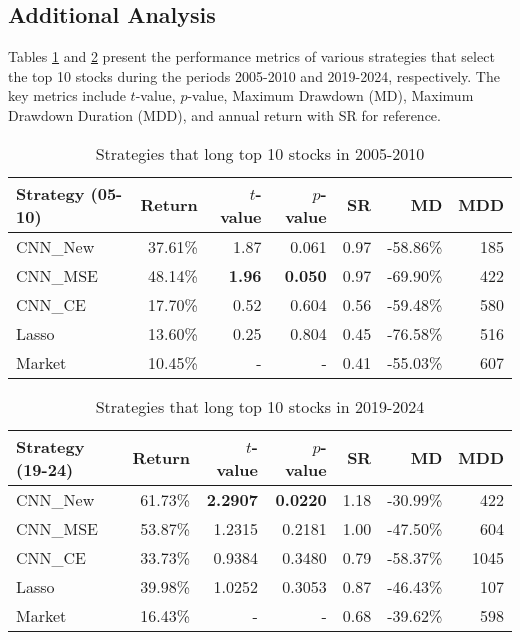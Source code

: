 \documentclass[preprint,12pt,numafflabel,authoryear]{elsarticle}
\begin{document}
\subsection{Additional Analysis}
\label{sec:Additional Analysis}

Tables \ref{tab:compare_05-10} and \ref{tab:compare_19-24} present the performance metrics of various strategies that select the top 10 stocks during the periods 2005-2010 and 2019-2024, respectively. The key metrics include $t$-value, $p$-value, Maximum Drawdown (MD), Maximum Drawdown Duration (MDD), and annual return with SR for reference.

\begin{table}[htp]
\centering
\begin{tabular}{lrrrrrr}
\toprule
Strategy (05-10) &  Return &  $t$-value & $p$-value &  SR &  MD &  MDD \\
\midrule
CNN\_New &             37.61\% &   1.87 &   0.061 &        0.97 &       -58.86\% &                    185 \\
CNN\_MSE &             48.14\% &   \textbf{1.96} &   \textbf{0.050} &        0.97 &       -69.90\% &                    422 \\
CNN\_CE &             17.70\% &   0.52 &   0.604 &        0.56 &       -59.48\% &                    580 \\
Lasso &             13.60\% &   0.25 &   0.804 &        0.45 &       -76.58\% &                    516 \\
Market &             10.45\% &      - &      - &        0.41 &       -55.03\% &                    607 \\
\bottomrule
\end{tabular}
\caption{Strategies that long top 10 stocks in 2005-2010}
\label{tab:compare_05-10}
\end{table}

\begin{table}[htp]
\centering
\begin{tabular}{lrrrrrr}
\toprule
            Strategy (19-24) &  Return &  $t$-value &  $p$-value &  SR &  MD &  MDD \\
\midrule
       CNN\_New &             61.73\% &   \textbf{2.2907} &   \textbf{0.0220} &        1.18 &       -30.99\% &                    422 \\
       CNN\_MSE &             53.87\% &   1.2315 &   0.2181 &        1.00 &       -47.50\% &                    604 \\
        CNN\_CE &             33.73\% &   0.9384 &   0.3480 &        0.79 &       -58.37\% &                   1045 \\
         Lasso &             39.98\% &   1.0252 &   0.3053 &        0.87 &       -46.43\% &                    107 \\
 Market &             16.43\% &      - &      - &        0.68 &       -39.62\% &                    598 \\
\bottomrule
\end{tabular}
\caption{Strategies that long top 10 stocks in 2019-2024}
\label{tab:compare_19-24}
\end{table}
\end{document}
